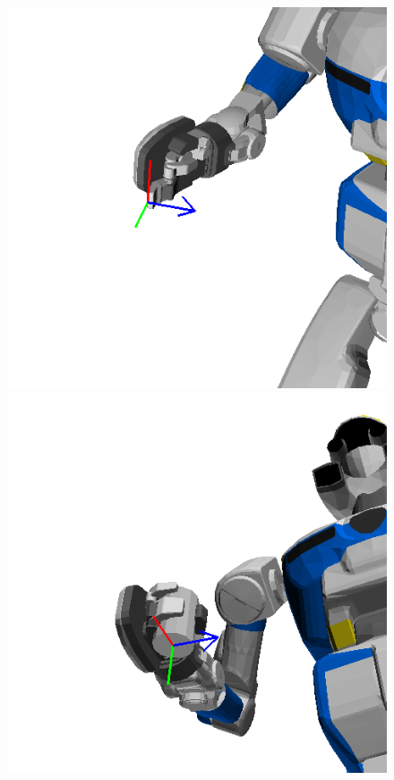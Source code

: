 \begin{figure}[htbp]
 \begin{center}
   \begin{minipage}{0.30\hsize}
     \begin{center}
       \includegraphics[clip, width=1.0\columnwidth]{figs/finger-move-target.png}
     \end{center}
   \end{minipage}
   \begin{minipage}{0.30\hsize}
     \begin{center}
       \includegraphics[clip, width=1.0\columnwidth]{figs/hanko-move-target.png}

\end{center}
\end{minipage}
\end{center}
\end{figure}
